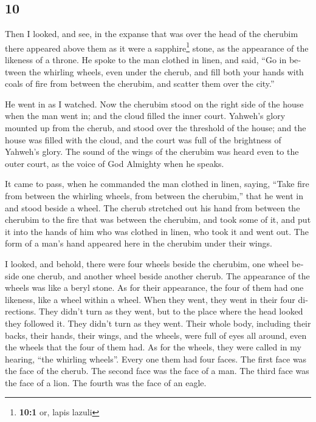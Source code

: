 \begin{paracol}{2}
\switchcolumn
\begin{otherlanguage}{english}

\hypertarget{section-19}{%
\section{10}\label{section-19}}

 Then I looked, and see, in the expanse that was over the
head of the cherubim there appeared above them as it were a
sapphire\footnote{\textbf{10:1} or, lapis lazuli} stone, as the
appearance of the likeness of a throne.  He spoke to the
man clothed in linen, and said, ``Go in between the whirling wheels,
even under the cherub, and fill both your hands with coals of fire from
between the cherubim, and scatter them over the city.''

He went in as I watched.  Now the cherubim stood on the
right side of the house when the man went in; and the cloud filled the
inner court.  Yahweh's glory mounted up from the cherub,
and stood over the threshold of the house; and the house was filled with
the cloud, and the court was full of the brightness of Yahweh's glory.
 The sound of the wings of the cherubim was heard even to
the outer court, as the voice of God Almighty when he speaks.

 It came to pass, when he commanded the man clothed in
linen, saying, ``Take fire from between the whirling wheels, from
between the cherubim,'' that he went in and stood beside a wheel.
 The cherub stretched out his hand from between the
cherubim to the fire that was between the cherubim, and took some of it,
and put it into the hands of him who was clothed in linen, who took it
and went out.  The form of a man's hand appeared here in
the cherubim under their wings.

 I looked, and behold, there were four wheels beside the
cherubim, one wheel beside one cherub, and another wheel beside another
cherub. The appearance of the wheels was like a beryl stone.
 As for their appearance, the four of them had one
likeness, like a wheel within a wheel.  When they went,
they went in their four directions. They didn't turn as they went, but
to the place where the head looked they followed it. They didn't turn as
they went.  Their whole body, including their backs,
their hands, their wings, and the wheels, were full of eyes all around,
even the wheels that the four of them had.  As for the
wheels, they were called in my hearing, ``the whirling wheels''.
 Every one them had four faces. The first face was the
face of the cherub. The second face was the face of a man. The third
face was the face of a lion. The fourth was the face of an eagle.


\end{otherlanguage}
\end{paracol}
